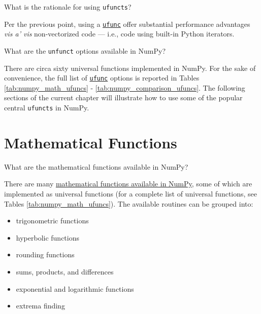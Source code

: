 \documentclass[a4paper,11pt]{book}
\numberwithin{figure}{chapter}
\numberwithin{table}{chapter}
\newcommand{\question}[1]{%
    \begin{tcolorbox}[colback=comp_c!10,colframe=comp_c,sidebyside align=top,width=\linewidth,before skip=1ex]
        #1
    \end{tcolorbox}
    \switchcolumn%
}
\newcommand{\note}[1]{%
    \begin{tcolorbox}[colback=white!0,colframe=white!10,width=\linewidth,before skip=1ex]
        #1
    \end{tcolorbox}
}
\begin{document}
\begin{paracol}{2}
	\question{\raggedright What is the rationale for using \texttt{ufuncts}?}
	\note{Per the previous point, using a \href{https://numpy.org/doc/stable/reference/ufuncs.html}{\texttt{ufunc}} offer substantial performance advantages \textit{vis a' vis} non-vectorized code --- i.e., code using built-in Python iterators.}
\end{paracol}

\begin{paracol}{2}
	\question{\raggedright What are the \texttt{unfunct} options available in NumPy?}
	\note{There are circa sixty universal functions implemented in NumPy. For the sake of convenience, the full list of \href{https://numpy.org/doc/stable/reference/ufuncs.html}{\texttt{ufunc}} options is reported in Tables \ref{tab:numpy_math_ufuncs} - \ref{tab:numpy_comparison_ufuncs}. The following sections of the current chapter will illustrate how to use some of the popular central \texttt{ufuncts} in NumPy.}
\end{paracol}

\section{Mathematical Functions}

\begin{paracol}{2}
\question{\raggedright What are the mathematical functions available in NumPy?}
\note{There are many \href{https://numpy.org/doc/stable/reference/routines.math.html}{mathematical functions available in NumPy}, some of which are implemented as universal functions (for a complete list of universal functions, see Tables \ref{tab:numpy_math_ufuncs}). The available routines can be grouped into:
\begin{itemize}
\item trigonometric functions 
\item hyperbolic functions 
\item rounding functions 
\item sums, products, and differences 
\item exponential and logarithmic functions
\item extrema finding  
\end{itemize}}
\end{paracol}
\clearpage
\end{document}
